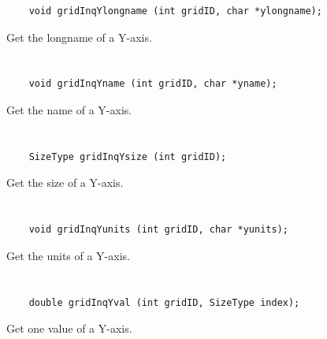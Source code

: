 \begin{verbatim}
    void gridInqYlongname (int gridID, char *ylongname);
\end{verbatim}

Get the longname of a Y-axis.


\section*{\tt {}}

\begin{verbatim}
    void gridInqYname (int gridID, char *yname);
\end{verbatim}

Get the name of a Y-axis.


\section*{\tt {}}

\begin{verbatim}
    SizeType gridInqYsize (int gridID);
\end{verbatim}

Get the size of a Y-axis.


\section*{\tt {}}

\begin{verbatim}
    void gridInqYunits (int gridID, char *yunits);
\end{verbatim}

Get the units of a Y-axis.


\section*{\tt {}}

\begin{verbatim}
    double gridInqYval (int gridID, SizeType index);
\end{verbatim}

Get one value of a Y-axis.


\section*{\tt {}}

